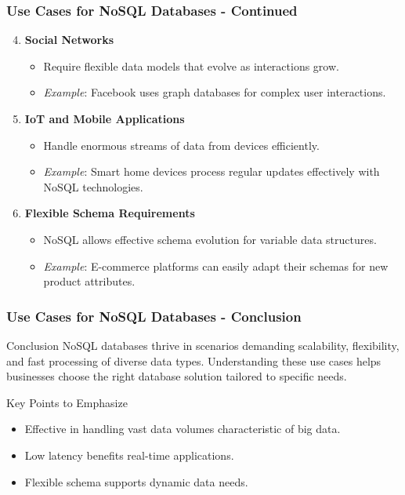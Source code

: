 \documentclass[aspectratio=169]{beamer}
\begin{document}
\begin{frame}[fragile]
    \frametitle{Use Cases for NoSQL Databases - Continued}
    \begin{enumerate}
        \setcounter{enumi}{3} %
        \item \textbf{Social Networks}
            \begin{itemize}
                \item Require flexible data models that evolve as interactions grow.
                \item \textit{Example}: Facebook uses graph databases for complex user interactions. 
            \end{itemize}

        \item \textbf{IoT and Mobile Applications}
            \begin{itemize}
                \item Handle enormous streams of data from devices efficiently.
                \item \textit{Example}: Smart home devices process regular updates effectively with NoSQL technologies.
            \end{itemize}

        \item \textbf{Flexible Schema Requirements}
            \begin{itemize}
                \item NoSQL allows effective schema evolution for variable data structures.
                \item \textit{Example}: E-commerce platforms can easily adapt their schemas for new product attributes.
            \end{itemize}
    \end{enumerate}
\end{frame}

\begin{frame}[fragile]
    \frametitle{Use Cases for NoSQL Databases - Conclusion}
    \begin{block}{Conclusion}
        NoSQL databases thrive in scenarios demanding scalability, flexibility, and fast processing of diverse data types. 
        Understanding these use cases helps businesses choose the right database solution tailored to specific needs.
    \end{block}
    
    \begin{block}{Key Points to Emphasize}
        \begin{itemize}
            \item Effective in handling vast data volumes characteristic of big data.
            \item Low latency benefits real-time applications.
            \item Flexible schema supports dynamic data needs.
        \end{itemize}
    \end{block}
\end{frame}
\end{document}
